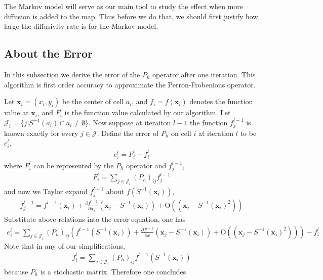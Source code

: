 \documentclass{article}
\begin{document}
The Markov model will serve as our main tool to study the effect
when more diffusion is added to the map. Thus before we do that, we
should first justify how large the diffusivity rate is for the
Markov model.

\subsection{About the Error}
In this subsection we derive the error of the $P_h$ operator after
one iteration. This algorithm is first order accuracy to approximate
the Perron-Frobenious operator.


Let $\mathbf{x}_i = (x_i,y_i)$ be the center of cell $a_i$, and $f_i
= f(\mathbf{x}_i)$ denotes the function value at $\mathbf{x}_i$, and
$F_i$ is the function value calculated by our algorithm. Let
$\mathcal{J}_i = \{j | S^{-1}(a_i) \cap a_i \neq \emptyset\}$. Now
suppose at iteraiton $l-1$ the function $f_j^{l-1}$ is known exactly
for every $j \in \mathcal{J}$. Define the error of $P_h$ on cell $i$
at iteration $l$ to be $e_i^l$,
\begin{eqnarray}
e_i^l = F_i^l - f_i^l
\end{eqnarray}
where $F_i^l$ can be represented by the $P_h$ operator and $f_j^{l-1}$,
\begin{eqnarray}
F_i^l = \sum_{j \in \mathcal{J}_i} (P_h)_{ij} f_j^{l-1}
\end{eqnarray}
and now we Taylor expand $f_j^{l-1}$ about $f(S^{-1}(\mathbf{x}_i))$,
\begin{eqnarray}
f_j^{l-1}  = f^{l-1}(\mathbf{x}_i) +
\frac{\partial{f^{l-1}}}{\partial{\mathbf{x}_i}}
(\mathbf{x}_j-S^{-1}(\mathbf{x}_i))
           + \text{O}((\mathbf{x}_j-S^{-1}(\mathbf{x}_i)^2))
\end{eqnarray}
Substitute above relations into the error equation, one has
\begin{eqnarray}
e_i^l = \sum_{j \in\mathcal{J}_i} (P_h)_{ij}
\left(f^{l-1}(S^{-1}(\mathbf{x}_i))
        + \frac{\partial{f^{l-1}}}{\partial{x}} (\mathbf{x}_j-S^{-1}(\mathbf{x}_i))
        + \text{O}((\mathbf{x}_j-S^{-1}(\mathbf{x}_i)^2))\right) - f_i^l
\end{eqnarray}
Note that in any of our simplifications,
\begin{eqnarray}
f_i^l = \sum_{j \in \mathcal{J}_i} (P_h)_{ij}
f^{l-1}(S^{-1}(\mathbf{x}_i))
\end{eqnarray}
because $P_h$ is a stochastic matrix. Therefore one concludes
\end{document}
